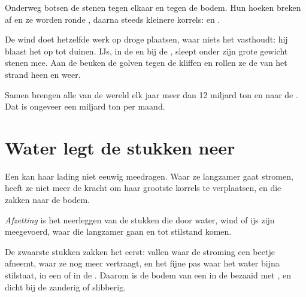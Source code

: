 Onderweg botsen de stenen tegen elkaar en tegen de bodem. Hun hoeken
breken af en ze worden ronde , daarna steeds kleinere korrels: 
en .

De wind doet hetzelfde werk op droge plaatsen, waar niets het 
vasthoudt: hij blaast het op tot duinen. IJs, in de  en bij de ,
sleept onder zijn grote gewicht stenen mee. Aan de  beuken de golven
tegen de kliffen en rollen ze de  van het strand heen en weer.

\begin{remark}[Hoeveel?]\label{rem:g5:water-shapes-the-land:how-much}
Samen brengen alle  van de wereld elk jaar meer dan 12 miljard ton
 en  naar de . Dat is ongeveer een miljard ton per maand.
\end{remark}

\section{Water legt de stukken neer}

Een  kan haar lading niet eeuwig meedragen. Waar ze langzamer gaat
stromen, heeft ze niet meer de kracht om haar grootste korrels te
verplaatsen, en die zakken naar de bodem.

\begin{definition}[Afzetting]\label{def:g5:water-shapes-the-land:deposition}
\emph{Afzetting} is het neerleggen van de stukken
 die door water, wind of ijs zijn meegevoerd, waar die langzamer
gaan en tot stilstand komen.
\end{definition}

De zwaarste stukken zakken het eerst:  vallen waar de stroming een
beetje afneemt,  waar ze nog meer vertraagt, en het fijne  pas waar
het water bijna stilstaat, in een  of in de . Daarom is de bodem
van een  in de  bezaaid met , en dicht bij de 
zanderig of slibberig.


